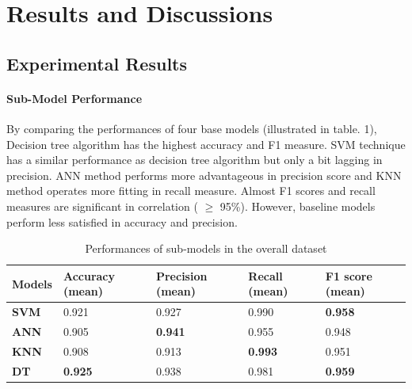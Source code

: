 \documentclass[runningheads]{llncs}
\begin{document}
\section{Results and Discussions}
%
%
\subsection{Experimental Results}
%
%
%
\paragraph{Sub-Model Performance}
%
By comparing the performances of four base models (illustrated in table. 1), Decision tree algorithm has the highest accuracy and F1 measure. SVM technique has a similar performance as decision tree algorithm but only a bit lagging in precision. ANN method performs more advantageous in precision score and KNN method operates more fitting in recall measure. Almost F1 scores and recall measures are significant in correlation ( $\geq$ 95\%). However, baseline models perform less satisfied in accuracy and precision. 
\begin{table}[h]
\begin{tabular}{|C{2cm}|C{2cm}|C{2cm}|C{2cm}|C{2cm}|}
\hline
{} 
{\color[HTML]{333333} \textbf{Models}} & {\color[HTML]{333333} \textbf{Accuracy (mean)}} & {\color[HTML]{333333} \textbf{Precision (mean)}} & {\color[HTML]{333333} \textbf{Recall (mean)}} & {\color[HTML]{333333} \textbf{F1 score (mean)}} \\ \hline
{} 
\textbf{SVM}  & 0.921  & 0.927 & 0.990  & \textbf{0.958}  \\ \hline
{} 
\textbf{ANN} & 0.905 & \textbf{0.941} & 0.955 & 0.948 \\ \hline
{} 
\textbf{KNN}  & 0.908   & 0.913  & \textbf{0.993}  & 0.951  \\ \hline
{} 
\textbf{DT} & \textbf{0.925}  & 0.938 & 0.981  & \textbf{0.959}  \\ \hline
\end{tabular}
\caption{Performances of sub-models in the overall dataset}
\label{submodels}
\end{table}
%
%
\end{document}
